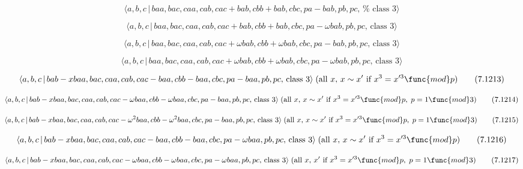 \documentclass[10pt]{article}
\begin{document}
\begin{equation}
\langle a,b,c\,|\,baa,bac,caa,cab,cac+bab,cbb+bab,cbc,pa-bab,pb,pc,\,\text{%
class }3\rangle  \tag{7.1209}
\end{equation}

\begin{equation}
\langle a,b,c\,|\,baa,bac,caa,cab,cac+bab,cbb+bab,cbc,pa-\omega bab,pb,pc,\,%
\text{class }3\rangle  \tag{7.1210}
\end{equation}

\begin{equation}
\langle a,b,c\,|\,baa,bac,caa,cab,cac+\omega bab,cbb+\omega
bab,cbc,pa-bab,pb,pc,\,\text{class }3\rangle  \tag{7.1211}
\end{equation}

\begin{equation}
\langle a,b,c\,|\,baa,bac,caa,cab,cac+\omega bab,cbb+\omega
bab,cbc,pa-\omega bab,pb,pc,\,\text{class }3\rangle  \tag{7.1212}
\end{equation}

\begin{equation}
\langle a,b,c\,|\,bab-xbaa,bac,caa,cab,cac-baa,cbb-baa,cbc,pa-baa,pb,pc,\,%
\text{class }3\rangle \;(\text{all }x,\,x \sim x^{\prime }\text{ if }%
x^3=x^{\prime 3}\func{mod}p)  \tag{7.1213}
\end{equation}

\begin{equation}
\langle a,b,c\,|\,bab-xbaa,bac,caa,cab,cac-\omega baa,cbb-\omega
baa,cbc,pa-baa,pb,pc,\,\text{class }3\rangle \;(\text{all }x,\,x\sim
x^{\prime}\text{ if }x^3=x^{\prime 3}\func{mod}p,\;p=1\func{mod}3) 
\tag{7.1214}
\end{equation}

\begin{equation}
\langle a,b,c\,|\,bab-xbaa,bac,caa,cab,cac-\omega ^{2}baa,cbb-\omega
^{2}baa,cbc,pa-baa,pb,pc,\,\text{class }3\rangle \;(\text{all }x,\,x\sim
x^{\prime}\text{ if }x^3=x^{\prime 3}\func{mod}p,\;p=1\func{mod}3) 
\tag{7.1215}
\end{equation}

\begin{equation}
\langle a,b,c\,|\,bab-xbaa,bac,caa,cab,cac-baa,cbb-baa,cbc,pa-\omega
baa,pb,pc,\,\text{class }3\rangle \;(\text{all }x,\,x\sim x^{\prime }\text{
if }x^{3}=x^{\prime 3}\func{mod}p)  \tag{7.1216}
\end{equation}

\begin{equation}
\langle a,b,c\,|\,bab-xbaa,bac,caa,cab,cac-\omega baa,cbb-\omega
baa,cbc,pa-\omega baa,pb,pc,\,\text{class }3\rangle \;(\text{all }%
x,\,x^{\prime} \text{ if }x^3=x^{\prime 3}\func{mod}p,\;p=1\func{mod}3) 
\tag{7.1217}
\end{equation}
\end{document}
